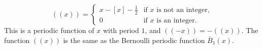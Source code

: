 $$
((x)) = \begin{cases}
x - [x] - \frac{1}{2} & \text{if } x \text{ is not an integer,} \\
0 & \text{if } x \text{ is an integer.}
\end{cases}
$$
This is a periodic function of $x$ with period $1$, and $((-x)) = -((x))$. The function $((x))$ is the same as the Bernoulli periodic function $\bar{B}_1(x)$.
